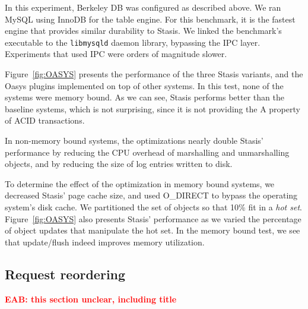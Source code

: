 \documentclass[letterpaper,twocolumn,10pt]{article}
\newcommand{\yad}{Stasis\xspace}
\newcommand{\yads}{Stasis'\xspace}
\newcommand{\oasys}{Oasys\xspace}
\newcommand{\eab}[1]{\textcolor{red}{\bf EAB: #1}}
\begin{document}
In this experiment, Berkeley DB was configured as described above.  We
ran MySQL using InnoDB for the table engine.  For this benchmark, it
is the fastest engine that provides similar durability to \yad. We
linked the benchmark's executable to the {\tt libmysqld} daemon library,
bypassing the IPC layer. Experiments that used IPC were orders of magnitude slower.

Figure~\ref{fig:OASYS} presents the performance of the three \yad
variants, and the \oasys plugins implemented on top of other
systems.  In this test, none of the systems were memory bound.  As
we can see, \yad performs better than the baseline systems, which is
not surprising, since it is not providing the A property of ACID
transactions.

In non-memory bound systems, the optimizations nearly double \yads
performance by reducing the CPU overhead of marshalling and
unmarshalling objects, and by reducing the size of log entries written
to disk.

To determine the effect of the optimization in memory bound systems,
we decreased \yads page cache size, and used O\_DIRECT to bypass the
operating system's disk cache.  We partitioned the set of objects
so that 10\% fit in a {\em hot set}.
Figure~\ref{fig:OASYS} also presents \yads performance as we varied the
percentage of object updates that manipulate the hot set.  In the
memory bound test, we see that update/flush indeed improves memory
utilization.

\subsection{Request reordering}

\eab{this section unclear, including title}
\end{document}
